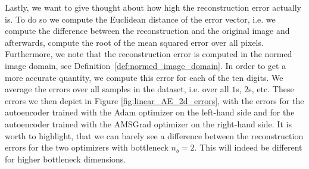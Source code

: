 Lastly, we want to give thought about how high the reconstruction error actually is. To do so we compute the Euclidean distance of the error vector, i.e. we compute the difference between the reconstruction and the original image and afterwards, compute the root of the mean squared error over all pixels. Furthermore, we note that the reconstruction error is computed in the normed image domain, see Definition~\ref{def:normed_image_domain}. In order to get a more accurate quantity, we compute this error for each of the ten digits. We average the errors over all samples in the dataset, i.e. over all $1$s, $2$s, etc. These errors we then depict in Figure \ref{fig:linear_AE_2d_errors}, with the errors for the autoencoder trained with the Adam optimizer on the left-hand side and for the autoencoder trained with the AMSGrad optimizer on the right-hand side. It is worth to highlight, that we can barely see a difference between the reconstruction errors for the two optimizers with bottleneck $n_b=2$. This will indeed be different for higher bottleneck dimensions.



